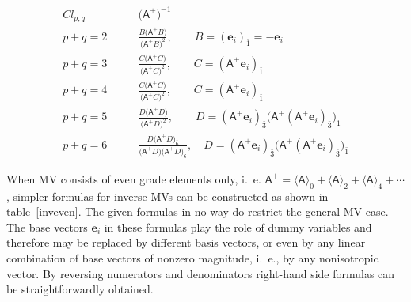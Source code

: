 \documentclass{birkjour}
\newcommand{\e}[1]{\mathbf{e}_{#1}} %
\def\m#1{\mathsf{#1}} %
\begin{document}
\begin{table}
\[\begin{array}{ll}
Cl_{p,q}&\qquad  \bigl(\m{A}^{+}\bigr)^{-1} \\[5pt]\hline
p+q=2&\qquad \frac{B \bigl(\m{A}^{+} B\bigr)} {\bigl(\m{A}^{+}
B\bigr)^2}, \qquad B =(\e{i})_{\bar{1}}=-\e{i}
\\[4pt]
  p+q=3 &\qquad \frac{C \bigl(\m{A}^{+} C\bigr)}
{\bigl(\m{A}^{+} C\bigr)^2}, \qquad C = (\m{A}^{+}
\e{i})_{\bar{1}}
\\[4pt]
  p+q=4&\qquad \frac{C \bigl(\m{A}^{+} C\bigr)}
{\bigl(\m{A}^{+} C\bigr)^2}, \qquad  C = (\m{A}^{+}
\e{i})_{\bar{1}}
\\[4pt]
 p+q=5&\qquad \frac{D \bigl(\m{A}^{+} D\bigr)}
{\bigl(\m{A}^{+} D\bigr)^2}, \qquad  D = (\m{A}^{+}
\e{i})_{\bar{3}} \bigl(\m{A}^{+} (\m{A}^{+}
\e{i})_{\bar{3}}\bigr)_{\bar{1}}
\\[4pt]
p+q=6&\qquad \frac{D \bigl(\m{A}^{+} D\bigr)_{\bar{6}}}
{\bigl(\m{A}^{+} D\bigr)\bigl(\m{A}^{+} D\bigr)_{\bar{6}}}, \quad
D = (\m{A}^{+} \e{i})_{\bar{3}} \bigl(\m{A}^{+} (\m{A}^{+}
\e{i})_{\bar{3}}\bigr)_{\bar{1}}
\end{array}
\]
\caption{\label{inveven} Explicit formulas of inverse of even
multivectors in a coordinate-free form for Clifford algebras of
dimension $p+q\le 6$. The quantities $\bigl(\m{A}^{+}
B\bigr)^2/\e{i}^2$, $\bigl(\m{A}^{+} C\bigr)^2/\e{i}^2$,
$\bigl(\m{A}^{+} D\bigr)^2/\e{i}^4$ and ${\bigl(\m{A}^{+}
D\bigr)\bigl(\m{A}^{+} D\bigr)_{\bar{6}}}/\e{i}^4$  are the
discriminants of respective multivectors. Here explicit
$\e{i}^2=\pm 1$ and $\e{i}^4=+1$ factors take into account the
correct sign and norm once the orthonormal base vector $\e{i}$ is replaced by arbitrary unnormalized and nonisotropic vector $v$.}
\end{table}


When  MV consists of even grade elements only, i.~e.
$\m{A}^{+}=\langle\m{A}\rangle_{0}+\langle\m{A}\rangle_{2}+\langle\m{A}\rangle_{4}+\cdots$,
simpler formulas for inverse MVs can be constructed as shown in
table~\ref{inveven}. The given formulas in no way do restrict the
general MV case. The base vectors $\e{i}$ in these formulas play
the role of dummy variables and therefore may be replaced by
different basis vectors, or even by any linear combination of base
vectors of nonzero magnitude, i.~e., by any nonisotropic vector.
By reversing numerators and denominators right-hand side formulas
can be straightforwardly obtained.
\end{document}

